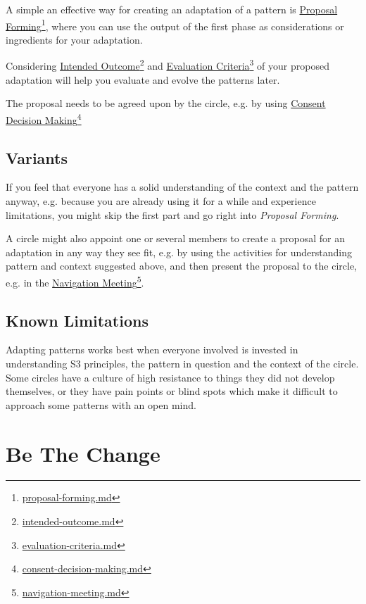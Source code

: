 A simple an effective way for creating an adaptation of a pattern is \href{proposal-forming.md}{Proposal Forming}\footnote{\href{proposal-forming.md}{proposal-forming.md}}, where you can use the output of the first phase as considerations or ingredients for your adaptation.

Considering \href{intended-outcome.md}{Intended Outcome}\footnote{\href{intended-outcome.md}{intended-outcome.md}} and \href{evaluation-criteria.md}{Evaluation Criteria}\footnote{\href{evaluation-criteria.md}{evaluation-criteria.md}} of your proposed adaptation will help you evaluate and evolve the patterns later.

The proposal needs to be agreed upon by the circle, e.g. by using \href{consent-decision-making.md}{Consent Decision Making}\footnote{\href{consent-decision-making.md}{consent-decision-making.md}}

\subsection{Variants}
\label{variants}

If you feel that everyone has a solid understanding of the context and the pattern anyway, e.g. because you are already using it for a while and experience limitations, you might skip the first part and go right into \emph{Proposal Forming}.

A circle might also appoint one or several members to create a proposal for an adaptation in any way they see fit, e.g. by using the activities for understanding pattern and context suggested above, and then present the proposal to the circle, e.g. in the \href{navigation-meeting.md}{Navigation Meeting}\footnote{\href{navigation-meeting.md}{navigation-meeting.md}}.

\subsection{Known Limitations}
\label{knownlimitations}

Adapting patterns works best when everyone involved is invested in understanding S3 principles, the pattern in question and the context of the circle. Some circles have a culture of high resistance to things they did not develop themselves, or they have pain points or blind spots which make it difficult to approach some patterns with an open mind.

\section{Be The Change}
\label{bethechange}

